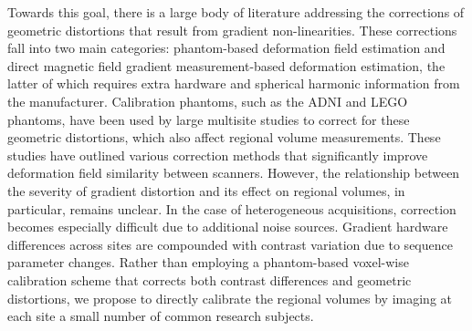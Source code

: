 Towards this goal, there is a large body of literature addressing the corrections of geometric distortions that result from gradient non-linearities. These corrections fall into two main categories: phantom-based deformation field estimation and direct magnetic field gradient measurement-based deformation estimation, the latter of which requires extra hardware and spherical harmonic information from the manufacturer\cite{fonov2010improved}. Calibration phantoms, such as the ADNI \cite{gunter2009measurement} and LEGO phantoms\cite{caramanos2010gradient}, have been used by large multisite studies to correct for these geometric distortions, which also affect regional volume measurements. These studies have outlined various correction methods that significantly improve deformation field similarity between scanners. However, the relationship between the severity of gradient distortion and its effect on regional volumes, in particular, remains unclear. In the case of heterogeneous acquisitions, correction becomes especially difficult due to additional noise sources. Gradient hardware differences across sites are compounded with contrast variation due to sequence parameter changes. %
Rather than employing a phantom-based voxel-wise calibration scheme that corrects both contrast differences and geometric distortions, we propose to directly calibrate the regional volumes by imaging at each site a small number of common research subjects.